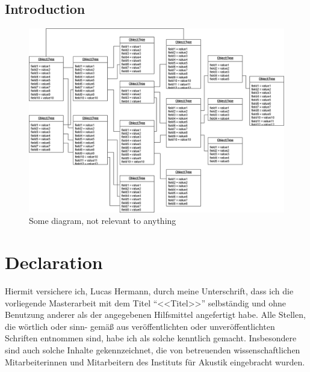 \documentclass[german=false,thesistype=master,nolistoftables,noabstract]{tubsthesis}
\begin{document}
    
    \begin{thesis}

        \chapter{Introduction}

        \lipsum[1-3]

        \begin{figure}
        \centering
        \includegraphics[width=\textwidth]{images/example_diagram.png}
        \caption{Some diagram, not relevant to anything~\cite{lisa}}
        \label{fig:inga}
        \end{figure}

        \lipsum[4-7]

    \end{thesis}

    

\chapter*{Declaration}
Hiermit versichere ich, Lucas Hermann, durch meine Unterschrift, dass ich die
vorliegende Masterarbeit mit dem Titel ``<<Titel>>'' selbständig und ohne Benutzung
anderer als der angegebenen Hilfsmittel angefertigt habe. Alle Stellen, die wörtlich oder sinn-
gemäß aus veröffentlichten oder unveröffentlichten Schriften entnommen sind, habe ich als
solche kenntlich gemacht. Insbesondere sind auch solche Inhalte gekennzeichnet, die von
betreuenden wissenschaftlichen Mitarbeiterinnen und Mitarbeitern des Instituts für Akustik eingebracht wurden.
\end{document}
